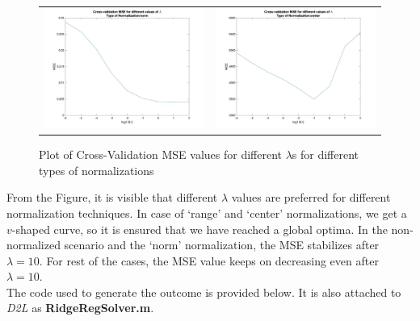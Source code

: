 \documentclass[11pt]{article}
\begin{document}
\begin{figure}[H]
\begin{adjustbox}{width=0.8\paperwidth}
\begin{tabular}{c c}
			\includegraphics{Codes/MSE_Plots_norm.jpg} & \includegraphics{Codes/MSE_Plots_center.jpg}\\
		\end{tabular}
	\end{adjustbox}
	\caption{Plot of Cross-Validation MSE values for different $\lambda$s for different types of normalizations}
	\label{Fig: MSE_Plot}
\end{figure}

From the Figure, it is visible that different $\lambda$ values are preferred for different normalization techniques. In case of `range' and `center' normalizations, we get a $v$-shaped curve, so it is ensured that we have reached a global optima. In the non-normalized scenario and the `norm' normalization, the MSE stabilizes after $\lambda=10$. For rest of the cases, the MSE value keeps on decreasing even after $\lambda=10$.\\
  
The code used to generate the outcome is provided below. It is also attached to \textit{D2L} as \textbf{RidgeRegSolver.m}.
  

\end{document}
